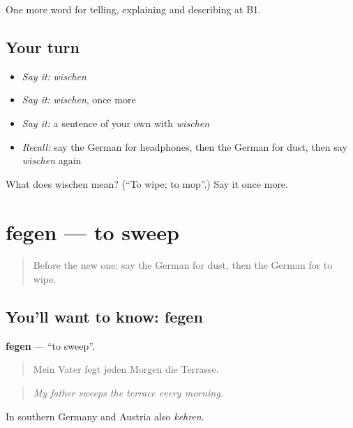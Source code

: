 \begin{grammarlens}[title={What you've built}]
One more word for telling, explaining and describing at B1.
\end{grammarlens}

\subsection*{Your turn}
\begin{itemize}
\raggedright
  \item \emph{Say it:} \emph{wischen}
  \item \emph{Say it:} \emph{wischen}, once more
  \item \emph{Say it:} a sentence of your own with \emph{wischen}
  \item \emph{Recall:} say the German for headphones, then the German for dust, then say \emph{wischen} again
\end{itemize}

\begin{tcolorbox}[breakable,colback=teal!4,colframe=teal!35!black,title={Before you move on}]
What does wischen mean? (\textquotedblleft{}To wipe; to mop\textquotedblright{}.) Say it once more.
\end{tcolorbox}
\section[fegen]{fegen — to sweep}

\label{lesson:GE-C526-fegen}



\begin{quote}
Before the new one: say the German for dust, then the German for to wipe.
\end{quote}

\subsection*{You'll want to know: fegen}
\textbf{fegen} — \textquotedblleft{}to sweep\textquotedblright{}.

\begin{quote}
Mein Vater fegt jeden Morgen die Terrasse.
\end{quote}

\begin{quote}
\emph{My father sweeps the terrace every morning.}
\end{quote}

In southern Germany and Austria also \emph{kehren}.

